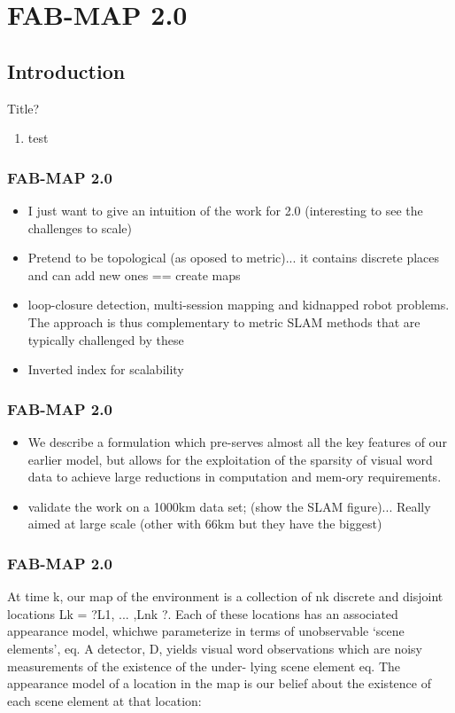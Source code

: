 \section{FAB-MAP 2.0}

\subsection{Introduction}
\begin{frame}{Title?}
   \begin{enumerate}
       \item test
   \end{enumerate} 
\end{frame}


\begin{frame}
    \frametitle{FAB-MAP 2.0}
    \begin{itemize}
        \item I just want to give an intuition of the work for 2.0 (interesting to see the challenges to scale)
        \item Pretend to be topological (as oposed to metric)... it contains discrete places and can add new ones == create maps
        \item loop-closure detection, multi-session mapping and kidnapped robot problems. The approach is thus complementary to metric SLAM methods that are typically challenged by these
        \item Inverted index for scalability
    \end{itemize}
\end{frame}

\begin{frame}
    \frametitle{FAB-MAP 2.0}
    \begin{itemize}
        \item We describe a formulation which pre-serves almost all the key features of our earlier model, but allows for the exploitation of the sparsity of visual word data to achieve large reductions in computation and mem-ory requirements.
        \item validate the work on a 1000km data set; (show the SLAM figure)... Really aimed at large scale (other with 66km but they have the biggest)
    \end{itemize}
\end{frame}

\begin{frame}
    \frametitle{FAB-MAP 2.0}
    At time k, our map of the environment is a collection of nk discrete and disjoint locations Lk = ?L1, ... ,Lnk ?. Each of these locations has an associated appearance model, whichwe parameterize in terms of unobservable ‘scene elements’, eq. A detector, D, yields visual word observations which are noisy measurements of the existence of the under- lying scene element eq. The appearance model of a location in the map is our belief about the existence of each scene element at that location:
\end{frame}

